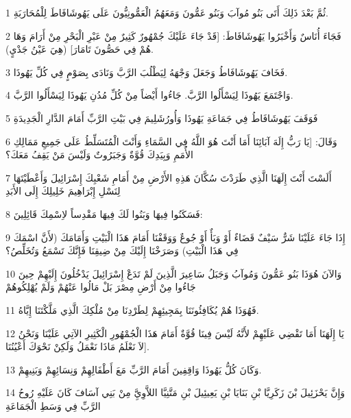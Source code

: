 \par 1 ثُمَّ بَعْدَ ذَلِكَ أَتَى بَنُو مُوآبَ وَبَنُو عَمُّونَ وَمَعَهُمُ الْعَمُّونِيُّونَ عَلَى يَهُوشَافَاطَ لِلْمُحَارَبَةِ.
\par 2 فَجَاءَ أُنَاسٌ وَأَخْبَرُوا يَهُوشَافَاطَ: [قَدْ جَاءَ عَلَيْكَ جُمْهُورٌ كَثِيرٌ مِنْ عَبْرِ الْبَحْرِ مِنْ أَرَامَ وَهَا هُمْ فِي حَصُّونَ تَامَارَ] (هِيَ عَيْنُ جَدْيٍ).
\par 3 فَخَافَ يَهُوشَافَاطُ وَجَعَلَ وَجْهَهُ لِيَطْلُبَ الرَّبَّ وَنَادَى بِصَوْمٍ فِي كُلِّ يَهُوذَا.
\par 4 وَاجْتَمَعَ يَهُوذَا لِيَسْأَلُوا الرَّبَّ. جَاءُوا أَيْضاً مِنْ كُلِّ مُدُنِ يَهُوذَا لِيَسْأَلُوا الرَّبَّ.
\par 5 فَوَقَفَ يَهُوشَافَاطُ فِي جَمَاعَةِ يَهُوذَا وَأُورُشَلِيمَ فِي بَيْتِ الرَّبِّ أَمَامَ الدَّارِ الْجَدِيدَةِ
\par 6 وَقَالَ: [يَا رَبُّ إِلَهَ آبَائِنَا أَمَا أَنْتَ هُوَ اللَّهُ فِي السَّمَاءِ وَأَنْتَ الْمُتَسَلِّطُ عَلَى جَمِيعِ مَمَالِكِ الأُمَمِ وَبِيَدِكَ قُوَّةٌ وَجَبَرُوتٌ وَلَيْسَ مَنْ يَقِفُ مَعَكَ؟
\par 7 أَلَسْتَ أَنْتَ إِلَهَنَا الَّذِي طَرَدْتَ سُكَّانَ هَذِهِ الأَرْضِ مِنْ أَمَامِ شَعْبِكَ إِسْرَائِيلَ وَأَعْطَيْتَهَا لِنَسْلِ إِبْرَاهِيمَ خَلِيلِكَ إِلَى الأَبَدِ
\par 8 فَسَكَنُوا فِيهَا وَبَنُوا لَكَ فِيهَا مَقْدِساً لاِسْمِكَ قَائِلِينَ:
\par 9 إِذَا جَاءَ عَلَيْنَا شَرٌّ سَيْفٌ قَضَاءٌ أَوْ وَبَأٌ أَوْ جُوعٌ وَوَقَفْنَا أَمَامَ هَذَا الْبَيْتِ وَأَمَامَكَ (لأَنَّ اسْمَكَ فِي هَذَا الْبَيْتِ) وَصَرَخْنَا إِلَيْكَ مِنْ ضِيقِنَا فَإِنَّكَ تَسْمَعُ وَتُخَلِّصُ؟
\par 10 وَالآنَ هُوَذَا بَنُو عَمُّونَ وَمُوآبُ وَجَبَلُ سَاعِيرَ الَّذِينَ لَمْ تَدَعْ إِسْرَائِيلَ يَدْخُلُونَ إِلَيْهِمْ حِينَ جَاءُوا مِنْ أَرْضِ مِصْرَ بَلْ مَالُوا عَنْهُمْ وَلَمْ يُهْلِكُوهُمْ
\par 11 فَهُوَذَا هُمْ يُكَافِئُونَنَا بِمَجِيئِهِمْ لِطَرْدِنَا مِنْ مُلْكِكَ الَّذِي مَلَّكْتَنَا إِيَّاهُ.
\par 12 يَا إِلَهَنَا أَمَا تَقْضِي عَلَيْهِمْ لأَنَّهُ لَيْسَ فِينَا قُوَّةٌ أَمَامَ هَذَا الْجُمْهُورِ الْكَثِيرِ الآتِي عَلَيْنَا وَنَحْنُ لاَ نَعْلَمُ مَاذَا نَعْمَلُ وَلَكِنْ نَحْوَكَ أَعْيُنُنَا].
\par 13 وَكَانَ كُلُّ يَهُوذَا وَاقِفِينَ أَمَامَ الرَّبِّ مَعَ أَطْفَالِهِمْ وَنِسَائِهِمْ وَبَنِيهِمْ.
\par 14 وَإِنَّ يَحْزَئِيلَ بْنَ زَكَرِيَّا بْنِ بَنَايَا بْنِ يَعِيئِيلَ بْنِ مَتَّنِيَّا اللاَّوِيَِّ مِنْ بَنِي آسَافَ كَانَ عَلَيْهِ رُوحُ الرَّبِّ فِي وَسَطِ الْجَمَاعَةِ
